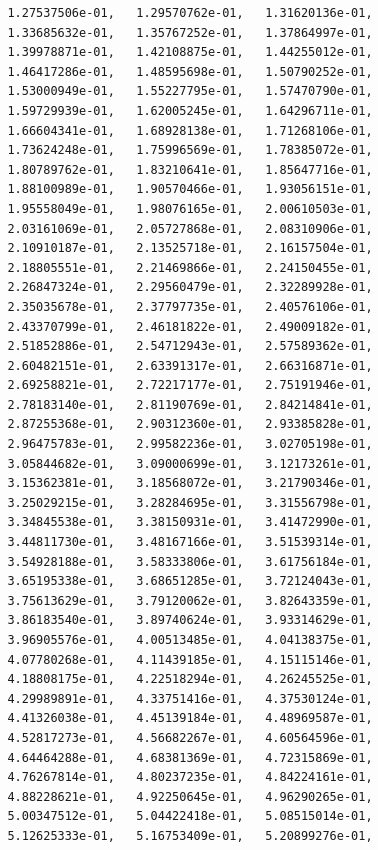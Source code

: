 \documentclass[11pt]{article}
\begin{document}
\begin{verbatim}
         1.27537506e-01,   1.29570762e-01,   1.31620136e-01,
         1.33685632e-01,   1.35767252e-01,   1.37864997e-01,
         1.39978871e-01,   1.42108875e-01,   1.44255012e-01,
         1.46417286e-01,   1.48595698e-01,   1.50790252e-01,
         1.53000949e-01,   1.55227795e-01,   1.57470790e-01,
         1.59729939e-01,   1.62005245e-01,   1.64296711e-01,
         1.66604341e-01,   1.68928138e-01,   1.71268106e-01,
         1.73624248e-01,   1.75996569e-01,   1.78385072e-01,
         1.80789762e-01,   1.83210641e-01,   1.85647716e-01,
         1.88100989e-01,   1.90570466e-01,   1.93056151e-01,
         1.95558049e-01,   1.98076165e-01,   2.00610503e-01,
         2.03161069e-01,   2.05727868e-01,   2.08310906e-01,
         2.10910187e-01,   2.13525718e-01,   2.16157504e-01,
         2.18805551e-01,   2.21469866e-01,   2.24150455e-01,
         2.26847324e-01,   2.29560479e-01,   2.32289928e-01,
         2.35035678e-01,   2.37797735e-01,   2.40576106e-01,
         2.43370799e-01,   2.46181822e-01,   2.49009182e-01,
         2.51852886e-01,   2.54712943e-01,   2.57589362e-01,
         2.60482151e-01,   2.63391317e-01,   2.66316871e-01,
         2.69258821e-01,   2.72217177e-01,   2.75191946e-01,
         2.78183140e-01,   2.81190769e-01,   2.84214841e-01,
         2.87255368e-01,   2.90312360e-01,   2.93385828e-01,
         2.96475783e-01,   2.99582236e-01,   3.02705198e-01,
         3.05844682e-01,   3.09000699e-01,   3.12173261e-01,
         3.15362381e-01,   3.18568072e-01,   3.21790346e-01,
         3.25029215e-01,   3.28284695e-01,   3.31556798e-01,
         3.34845538e-01,   3.38150931e-01,   3.41472990e-01,
         3.44811730e-01,   3.48167166e-01,   3.51539314e-01,
         3.54928188e-01,   3.58333806e-01,   3.61756184e-01,
         3.65195338e-01,   3.68651285e-01,   3.72124043e-01,
         3.75613629e-01,   3.79120062e-01,   3.82643359e-01,
         3.86183540e-01,   3.89740624e-01,   3.93314629e-01,
         3.96905576e-01,   4.00513485e-01,   4.04138375e-01,
         4.07780268e-01,   4.11439185e-01,   4.15115146e-01,
         4.18808175e-01,   4.22518294e-01,   4.26245525e-01,
         4.29989891e-01,   4.33751416e-01,   4.37530124e-01,
         4.41326038e-01,   4.45139184e-01,   4.48969587e-01,
         4.52817273e-01,   4.56682267e-01,   4.60564596e-01,
         4.64464288e-01,   4.68381369e-01,   4.72315869e-01,
         4.76267814e-01,   4.80237235e-01,   4.84224161e-01,
         4.88228621e-01,   4.92250645e-01,   4.96290265e-01,
         5.00347512e-01,   5.04422418e-01,   5.08515014e-01,
         5.12625333e-01,   5.16753409e-01,   5.20899276e-01,

\end{verbatim}
\end{document}
